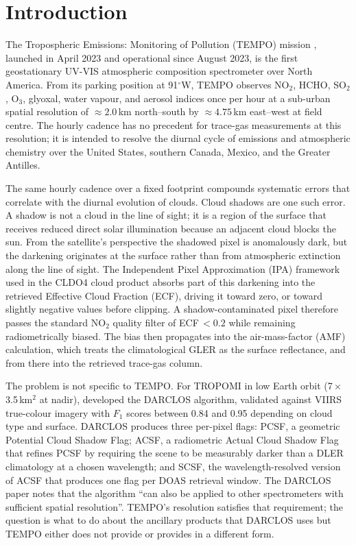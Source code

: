 \documentclass[11pt,a4paper]{article}
\newcommand{\degc}{$^{\circ}$}
\begin{document}
\section{Introduction}\label{sec:intro}

The Tropospheric Emissions: Monitoring of Pollution (TEMPO) mission
\citep{zoogman2017tempo}, launched in April 2023 and operational since
August 2023, is the first geostationary UV-VIS atmospheric composition
spectrometer over North America. From its parking position at 91\degc W,
TEMPO observes NO$_2$, HCHO, SO$_2$, O$_3$, glyoxal, water vapour, and
aerosol indices once per hour at a sub-urban spatial resolution of
$\approx 2.0$\,km north--south by $\approx 4.75$\,km east--west at field
centre. The hourly cadence has no precedent for trace-gas measurements at
this resolution; it is intended to resolve the diurnal cycle of emissions
and atmospheric chemistry over the United States, southern Canada,
Mexico, and the Greater Antilles.

The same hourly cadence over a fixed footprint compounds systematic
errors that correlate with the diurnal evolution of clouds. Cloud shadows
are one such error. A shadow is not a cloud in the line of sight; it is a
region of the surface that receives reduced direct solar illumination
because an adjacent cloud blocks the sun. From the satellite's
perspective the shadowed pixel is anomalously dark, but the darkening
originates at the surface rather than from atmospheric extinction along
the line of sight. The Independent Pixel Approximation (IPA) framework
used in the CLDO4 cloud product
\citep{vasilkov2018cldo, wang2025cldo4} absorbs part of this darkening
into the retrieved Effective Cloud Fraction (ECF), driving it toward
zero, or toward slightly negative values before clipping. A
shadow-contaminated pixel therefore passes the standard NO$_2$ quality
filter of ECF\,$<0.2$ while remaining radiometrically biased. The bias
then propagates into the air-mass-factor (AMF) calculation, which
treats the climatological GLER as the surface reflectance, and from
there into the retrieved trace-gas column.

The problem is not specific to TEMPO. For TROPOMI in low Earth orbit
(7\,$\times$\,3.5\,km$^2$ at nadir), \citet{trees2022darclos} developed
the DARCLOS algorithm, validated against VIIRS true-colour imagery with
$F_1$ scores between 0.84 and 0.95 depending on cloud type and surface.
DARCLOS produces three per-pixel flags: PCSF, a geometric Potential
Cloud Shadow Flag; ACSF, a radiometric Actual Cloud Shadow Flag that
refines PCSF by requiring the scene to be measurably darker than a DLER
climatology at a chosen wavelength; and SCSF, the wavelength-resolved
version of ACSF that produces one flag per DOAS retrieval window. The
DARCLOS paper notes that the algorithm ``can also be applied to other
spectrometers with sufficient spatial resolution''. TEMPO's resolution
satisfies that requirement; the question is what to do about the
ancillary products that DARCLOS uses but TEMPO either does not provide
or provides in a different form.
\end{document}
